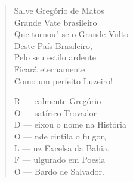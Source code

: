 \begin{verse}
Salve Gregório de Matos \\
Grande Vate brasileiro \\
Que tornou"-se o Grande Vulto \\
Deste País Brasileiro, \\
Pelo seu estilo ardente \\
Ficará eternamente \\
Como um perfeito Luzeiro! 


R --- ealmente Gregório \\
O --- satírico Trovador \\
D --- eixou o nome na História \\
O --- nde cintila o fulgor, \\
L --- uz Excelsa da Bahia, \\
F --- ulgurado em Poesia \\
O --- Bardo de Salvador. 

\end{verse}
